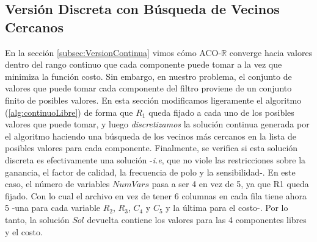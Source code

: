 \documentclass{llncs}
\begin{document}
	\subsection{Versión Discreta con Búsqueda de Vecinos Cercanos}
	\label{subsec:VersionDiscreta}
	En la sección \ref{subsec:VersionContinua} vimos cómo ACO-$\mathbb{R}$ converge hacia valores dentro del rango continuo que
	cada componente puede tomar a la vez
	que minimiza la función costo. Sin embargo, en nuestro problema, el conjunto de valores que puede tomar cada componente
	del filtro proviene de un conjunto finito de posibles valores. En esta sección modificamos ligeramente el algoritmo (\ref{alg:continuoLibre})
	de forma que $R_1$ queda fijado a cada uno de los posibles valores que puede tomar, y luego \textit{discretizamos} la solución 
	continua generada por el algoritmo haciendo una búsqueda de los vecinos más cercanos en la lista de posibles valores para cada
	componente. Finalmente, se verifica si esta solución discreta es efectivamente una solución -\textit{i.e}, que no viole las restricciones
	sobre la ganancia, el factor de calidad, la frecuencia de polo y la sensibilidad-.
	En este caso, el número de variables $NumVars$ pasa a ser 4 en vez de 5, ya que R1 queda fijado. Con lo cual el archivo en vez de
	tener 6 columnas en cada fila tiene ahora 5 -una para cada variable $R_2$, $R_3$, $C_4$ y $C_5$ y la última para el costo-.
	Por lo tanto, la solución $Sol$ devuelta contiene los valores para las 4 componentes libres y el costo.
	
\end{document}
